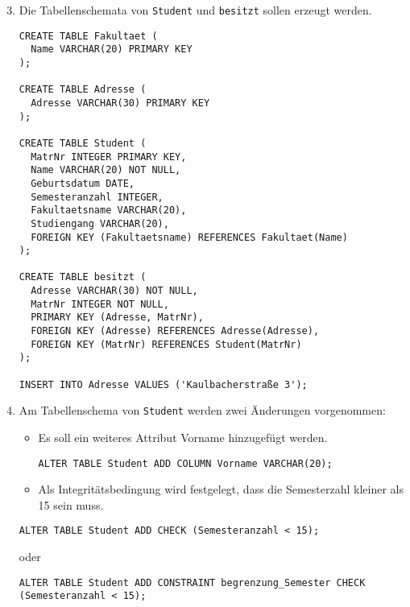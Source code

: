 \documentclass{lehramt-informatik-aufgabe}
\begin{document}
\begin{enumerate}
\setcounter{enumi}{2}

\item Die Tabellenschemata von \texttt{Student} und \texttt{besitzt}
sollen erzeugt werden.

\begin{antwort}
\begin{verbatim}
CREATE TABLE Fakultaet (
  Name VARCHAR(20) PRIMARY KEY
);

CREATE TABLE Adresse (
  Adresse VARCHAR(30) PRIMARY KEY
);

CREATE TABLE Student (
  MatrNr INTEGER PRIMARY KEY,
  Name VARCHAR(20) NOT NULL,
  Geburtsdatum DATE,
  Semesteranzahl INTEGER,
  Fakultaetsname VARCHAR(20),
  Studiengang VARCHAR(20),
  FOREIGN KEY (Fakultaetsname) REFERENCES Fakultaet(Name)
);

CREATE TABLE besitzt (
  Adresse VARCHAR(30) NOT NULL,
  MatrNr INTEGER NOT NULL,
  PRIMARY KEY (Adresse, MatrNr),
  FOREIGN KEY (Adresse) REFERENCES Adresse(Adresse),
  FOREIGN KEY (MatrNr) REFERENCES Student(MatrNr)
);

INSERT INTO Adresse VALUES ('Kaulbacherstraße 3');

\end{verbatim}
\end{antwort}

\item Am Tabellenschema von \texttt{Student} werden zwei Änderungen
vorgenommen:

\begin{itemize}
\item Es soll ein weiteres Attribut Vorname hinzugefügt werden.

\begin{antwort}
\begin{verbatim}
ALTER TABLE Student ADD COLUMN Vorname VARCHAR(20);
\end{verbatim}
\end{antwort}

\item Als Integritätsbedingung wird festgelegt, dass die Semesterzahl
kleiner als 15 sein muss.
\end{itemize}

\begin{antwort}
\begin{verbatim}
ALTER TABLE Student ADD CHECK (Semesteranzahl < 15);
\end{verbatim}

oder

\begin{verbatim}
ALTER TABLE Student ADD CONSTRAINT begrenzung_Semester CHECK (Semesteranzahl < 15);
\end{verbatim}
\end{antwort}

\end{enumerate}
\end{document}

